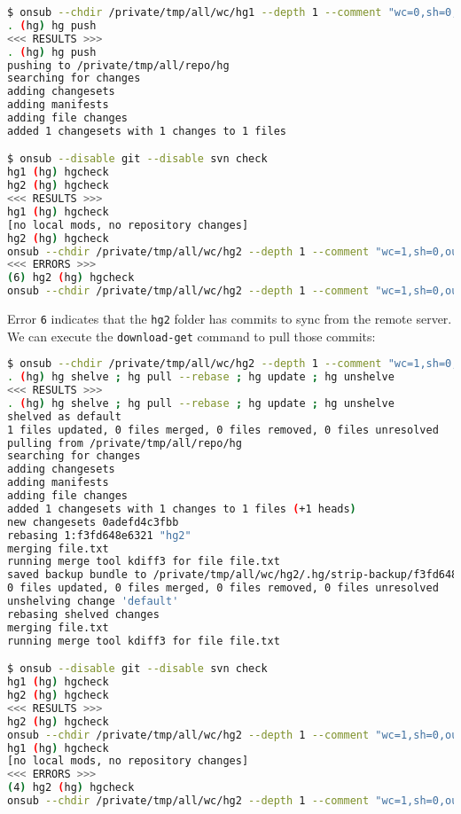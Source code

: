 \begin{snugshade}
\begin{lstlisting}[language=bash]	
$ onsub --chdir /private/tmp/all/wc/hg1 --depth 1 --comment "wc=0,sh=0,out=1,in=0" {upload}
. (hg) hg push
<<< RESULTS >>>
. (hg) hg push
pushing to /private/tmp/all/repo/hg
searching for changes
adding changesets
adding manifests
adding file changes
added 1 changesets with 1 changes to 1 files

$ onsub --disable git --disable svn check
hg1 (hg) hgcheck
hg2 (hg) hgcheck
<<< RESULTS >>>
hg1 (hg) hgcheck
[no local mods, no repository changes]
hg2 (hg) hgcheck
onsub --chdir /private/tmp/all/wc/hg2 --depth 1 --comment "wc=1,sh=0,out=1,in=1" {download-get}
<<< ERRORS >>>
(6) hg2 (hg) hgcheck
onsub --chdir /private/tmp/all/wc/hg2 --depth 1 --comment "wc=1,sh=0,out=1,in=1" {download-get}
\end{lstlisting}
\end{snugshade}

Error \lstinline{6} indicates that the \lstinline{hg2} folder has commits to sync from the remote server. We can execute the \lstinline{download-get} command to pull those commits:

\begin{snugshade}
\begin{lstlisting}[language=bash]	
$ onsub --chdir /private/tmp/all/wc/hg2 --depth 1 --comment "wc=1,sh=0,out=1,in=1" {download-get}
. (hg) hg shelve ; hg pull --rebase ; hg update ; hg unshelve
<<< RESULTS >>>
. (hg) hg shelve ; hg pull --rebase ; hg update ; hg unshelve
shelved as default
1 files updated, 0 files merged, 0 files removed, 0 files unresolved
pulling from /private/tmp/all/repo/hg
searching for changes
adding changesets
adding manifests
adding file changes
added 1 changesets with 1 changes to 1 files (+1 heads)
new changesets 0adefd4c3fbb
rebasing 1:f3fd648e6321 "hg2"
merging file.txt
running merge tool kdiff3 for file file.txt
saved backup bundle to /private/tmp/all/wc/hg2/.hg/strip-backup/f3fd648e6321-a76485e0-rebase.hg
0 files updated, 0 files merged, 0 files removed, 0 files unresolved
unshelving change 'default'
rebasing shelved changes
merging file.txt
running merge tool kdiff3 for file file.txt

$ onsub --disable git --disable svn check
hg1 (hg) hgcheck
hg2 (hg) hgcheck
<<< RESULTS >>>
hg2 (hg) hgcheck
onsub --chdir /private/tmp/all/wc/hg2 --depth 1 --comment "wc=1,sh=0,out=1,in=0" {put-upload}
hg1 (hg) hgcheck
[no local mods, no repository changes]
<<< ERRORS >>>
(4) hg2 (hg) hgcheck
onsub --chdir /private/tmp/all/wc/hg2 --depth 1 --comment "wc=1,sh=0,out=1,in=0" {put-upload}
\end{lstlisting}
\end{snugshade}

